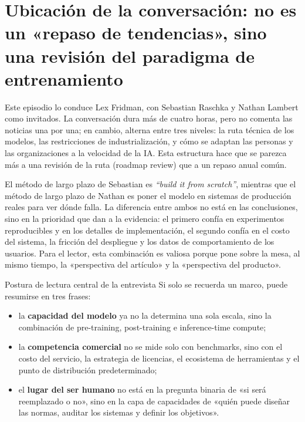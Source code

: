 \section{Ubicación de la conversación: no es un «repaso de tendencias», sino una revisión del paradigma de entrenamiento}

Este episodio lo conduce Lex Fridman, con Sebastian Raschka y Nathan Lambert como invitados. La conversación dura más de cuatro horas, pero no comenta las noticias una por una; en cambio, alterna entre tres niveles: la ruta técnica de los modelos, las restricciones de industrialización, y cómo se adaptan las personas y las organizaciones a la velocidad de la IA. Esta estructura hace que se parezca más a una revisión de la ruta (roadmap review) que a un repaso anual común.

El método de largo plazo de Sebastian es \textit{``build it from scratch''}, mientras que el método de largo plazo de Nathan es poner el modelo en sistemas de producción reales para ver dónde falla. La diferencia entre ambos no está en las conclusiones, sino en la prioridad que dan a la evidencia: el primero confía en experimentos reproducibles y en los detalles de implementación, el segundo confía en el costo del sistema, la fricción del despliegue y los datos de comportamiento de los usuarios. Para el lector, esta combinación es valiosa porque pone sobre la mesa, al mismo tiempo, la «perspectiva del artículo» y la «perspectiva del producto».

\begin{importantbox}{Postura de lectura central de la entrevista}
Si solo se recuerda un marco, puede resumirse en tres frases:
\begin{itemize}[leftmargin=1.5em]
    \item la \textbf{capacidad del modelo} ya no la determina una sola escala, sino la combinación de pre-training, post-training e inference-time compute;
    \item la \textbf{competencia comercial} no se mide solo con benchmarks, sino con el costo del servicio, la estrategia de licencias, el ecosistema de herramientas y el punto de distribución predeterminado;
    \item el \textbf{lugar del ser humano} no está en la pregunta binaria de «si será reemplazado o no», sino en la capa de capacidades de «quién puede diseñar las normas, auditar los sistemas y definir los objetivos».
\end{itemize}
\end{importantbox}

